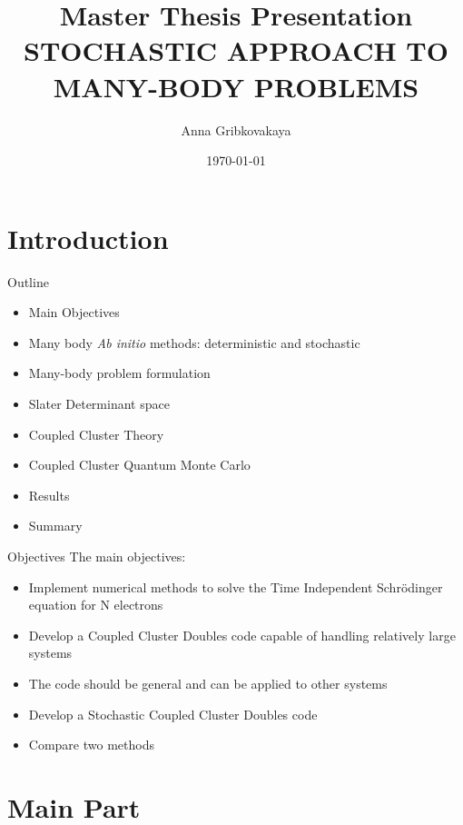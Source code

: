 \documentclass{beamer}
\title{Master Thesis Presentation\\
STOCHASTIC APPROACH TO MANY-BODY PROBLEMS}
\date{\today}
\author{Anna Gribkovakaya}
\institute{University of Oslo}
\begin{document}
  \maketitle
  \section{Introduction}
   \begin{frame}{Outline}
   \begin{itemize}
   	\item Main Objectives
   	\item Many body \textit{Ab initio} methods: deterministic and stochastic
   	\item Many-body problem formulation
   	\item Slater Determinant space
   	\item Coupled Cluster Theory
   	\item Coupled Cluster Quantum Monte Carlo
   	\item Results
   	\item Summary
   \end{itemize}
 \end{frame}
   \begin{frame}{Objectives}
	The main objectives:
	\begin{itemize}
 	\item Implement numerical methods to solve the Time Independent Schr\"{o}dinger equation for N electrons
 	\item Develop a Coupled Cluster Doubles code capable of handling relatively large systems
 	\item The code should be general and can be applied to other systems
 	\item Develop a Stochastic Coupled Cluster Doubles code
 	\item Compare two methods
	\end{itemize}
	\end{frame}


  \section{Main Part}
  
\end{document}
